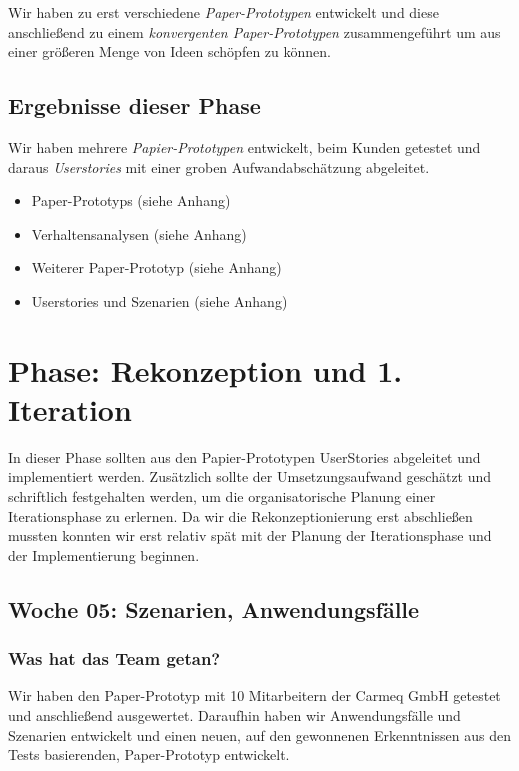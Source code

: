 \documentclass[12pt,a4paper]{article}
\begin{document}
Wir haben zu erst verschiedene \textit{Paper-Prototypen} entwickelt und diese anschlie\ss end zu einem \textit{konvergenten Paper-Prototypen} zusammengef\"uhrt um aus einer gr\"o\ss eren Menge von Ideen sch\"opfen zu k\"onnen. 

\subsection{Ergebnisse dieser Phase}

Wir haben mehrere \textit{Papier-Prototypen} entwickelt, beim Kunden getestet und daraus \textit{Userstories} mit einer groben Aufwandabsch\"atzung abgeleitet.

\begin{itemize}
\item Paper-Prototyps (siehe Anhang)
\item Verhaltensanalysen (siehe Anhang)
\item Weiterer Paper-Prototyp (siehe Anhang)
\item Userstories und Szenarien (siehe Anhang)
\end{itemize}



\section{Phase: Rekonzeption und 1. Iteration}

In dieser Phase sollten aus den Papier-Prototypen UserStories abgeleitet und implementiert werden. Zus\"atzlich sollte der Umsetzungsaufwand gesch\"atzt und schriftlich festgehalten werden, um die organisatorische Planung einer Iterationsphase zu erlernen. Da wir die Rekonzeptionierung erst abschlie\ss en mussten konnten wir erst relativ sp\"at mit der Planung der Iterationsphase und der Implementierung beginnen.

\subsection{Woche 05: Szenarien, Anwendungsf\"alle}

\subsubsection{Was hat das Team getan?}

Wir haben den Paper-Prototyp mit 10 Mitarbeitern der Carmeq GmbH getestet und anschlie\ss end ausgewertet. Daraufhin haben wir Anwendungsf\"alle und Szenarien entwickelt und einen neuen, auf den gewonnenen Erkenntnissen aus den Tests basierenden, Paper-Prototyp entwickelt.
\end{document}
